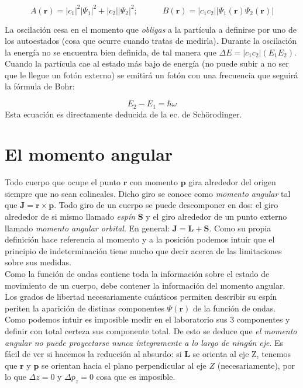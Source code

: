 \documentclass[12pt,a4paper]{article}
\numberwithin{equation}{section}
\numberwithin{figure}{section}
\newcommand{\tquad}{\quad \quad \quad}
\newcommand{\rn}{\mathbf{r}}
\newcommand{\pn}{\mathbf{p}}
\newcommand{\Jn}{\mathbf{J}}
\newcommand{\Sn}{\mathbf{S}}
\newcommand{\Ln}{\mathbf{L}}
\begin{document}
\begin{equation}
A(\rn) = |c_1|^2 |\Psi_1|^2 + |c_2||\Psi_2|^2 ;  \tquad B(\rn) = |c_1 c_2| |\Psi_1 (\rn) \Psi_2 (\rn)|
\end{equation}

La oscilación cesa en el momento que \textit{obligas} a la partícula a definirse por uno de los autoestados (cosa que ocurre cuando tratas de medirla). Durante la oscilación la energía no se encuentra bien definida, de tal manera que $\Delta E = |c_1 c_2 | (E_1 E_2)$. Cuando la partícula cae al estado más bajo de energía (no puede subir a no ser que le llegue un fotón externo) se emitirá un fotón con una frecuencia que seguirá la fórmula de Bohr:

\begin{equation}
E_2 - E_1  = \hbar \omega
\end{equation}
Esta ecuación es directamente deducida de la ec. de Schörodinger. 

\section{El momento angular}

Todo cuerpo que ocupe el punto $\rn$ con momento $\pn$ gira alrededor del origen siempre que no sean colineales. Dicho giro se conoce como \textit{momento angular} tal que $\Jn = \rn \times \pn$. Todo giro de un cuerpo se puede descomponer en dos: el giro alrededor de si mismo llamado \textit{espín} $\Sn$ y el giro alrededor de un punto externo llamado \textit{momento angular orbital}. En general: $\Jn = \Ln + \Sn$. Como su propia definición hace referencia al momento y a la posición podemos intuir que el principio de indeterminación tiene mucho que decir acerca de las limitaciones sobre sus medidas.\\

Como la función de ondas contiene toda la información sobre el estado de movimiento de un cuerpo, debe contener la información del momento angular. Los grados de libertad necesariamente cuánticos permiten describir su espín periten la aparición de distinas componentes $\Psi (\rn)$ de la función de ondas. \\

Como podemos intuir es imposible medir en el laboratorio sus 3 componentes y definir con total certeza sus componente total. De esto se deduce que \textit{el momento angular no puede proyectarse nunca íntegramente a lo largo de ningún eje}. Es fácil de ver si hacemos la reducción al absurdo: si $\Ln$ se orienta al eje Z, tenemos que $\rn$ y $\pn$ se orientan hacia el plano perpendicular al eje $Z$ (necesariamente), por lo que $\Delta z = 0$ y $\Delta p_z = 0$ cosa que es imposible. \\
\end{document}
